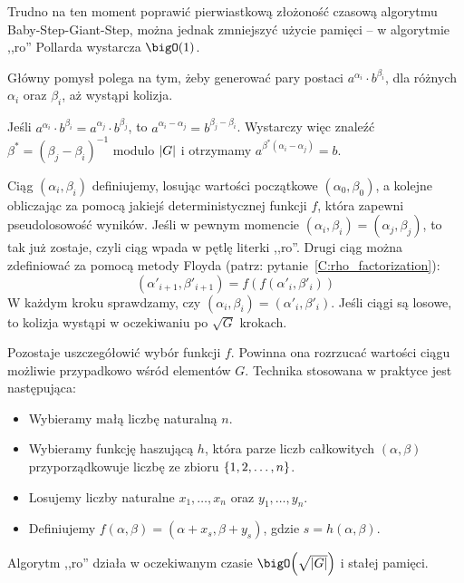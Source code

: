 Trudno na ten moment poprawić pierwiastkową złożoność czasową algorytmu Baby-Step-Giant-Step, można jednak zmniejszyć użycie pamięci -- w algorytmie ,,ro'' Pollarda wystarcza \( \bigO(1) \).

Główny pomysł polega na tym, żeby generować pary postaci \( a^{\alpha_i} \cdot b^{\beta_i} \), dla różnych \( \alpha_i \) oraz \( \beta_i \), aż wystąpi kolizja.

Jeśli \( a^{\alpha_i} \cdot b^{\beta_i} = a^{\alpha_j} \cdot b^{\beta_j} \), to \( a^{\alpha_i - \alpha_j} = b^{\beta_j - \beta_i} \). Wystarczy więc znaleźć \( \beta^{*} = (\beta_j - \beta_i)^{-1} \) modulo \( \left\lvert G\right\rvert \) i otrzymamy \( a^{\beta^{*} (\alpha_i - \alpha_j)} = b \).

Ciąg \( (\alpha_i, \beta_i) \) definiujemy, losując wartości początkowe \( (\alpha_0, \beta_0) \), a kolejne obliczając za pomocą jakiejś deterministycznej funkcji \( f \), która zapewni pseudolosowość wyników.
Jeśli w pewnym momencie \( (\alpha_i, \beta_i) = (\alpha_j, \beta_j) \), to tak już zostaje, czyli ciąg wpada w pętlę literki ,,ro''. Drugi ciąg można zdefiniować za pomocą metody Floyda (patrz: pytanie~\ref{C:rho_factorization}):
\[ (\alpha'_{i+1}, \beta'_{i+1}) = f(f(\alpha'_i, \beta'_i)) \]
W każdym kroku sprawdzamy, czy \( (\alpha_i, \beta_i) = (\alpha'_i, \beta'_i) \). Jeśli ciągi są losowe, to kolizja wystąpi w oczekiwaniu po \( \sqrt{G} \) krokach.

Pozostaje uszczegółowić wybór funkcji \( f \). Powinna ona rozrzucać wartości ciągu możliwie przypadkowo wśród elementów \( G \). Technika stosowana w praktyce jest następująca:
\begin{itemize}
    \onehalfspacing
    \item Wybieramy małą liczbę naturalną \( n \).
    \item Wybieramy funkcję haszującą \( h \), która parze liczb całkowitych \( (\alpha, \beta) \) przyporządkowuje liczbę ze zbioru \( \set{1, 2, \dots, n} \).
    \item Losujemy liczby naturalne \( x_1, \dots, x_n \) oraz \( y_1, \dots, y_n \).
    \item Definiujemy \( f(\alpha, \beta) = (\alpha + x_s, \beta + y_s) \), gdzie \( s = h(\alpha, \beta) \).
\end{itemize}

Algorytm ,,ro'' działa w oczekiwanym czasie \( \bigO\pars{\sqrt{\abs{G}}} \) i stałej pamięci.